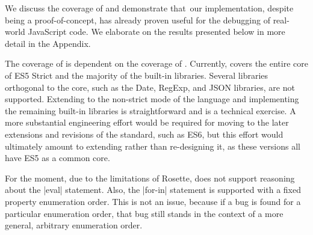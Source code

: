 
We discuss the coverage of \cosette and demonstrate that~our implementation, despite being  a proof-of-concept, has already proven useful for the debugging of real-world JavaScript code.
We elaborate on the results presented below in more detail in the Appendix. 





The coverage of \cosette is dependent on the coverage of \JSComp.
Currently, \JSComp covers the entire core of ES5 Strict and the majority of the built-in libraries.
Several libraries orthogonal to the core, such as the Date, RegExp, and JSON libraries, are not supported.
Extending \JSComp to the non-strict mode of the language and implementing the remaining built-in libraries is straightforward and is a technical exercise.
A more substantial engineering effort would be required for moving to the later extensions and revisions of the standard, such as ES6, but this effort would ultimately amount to extending \JSComp rather than re-designing it, as these versions all have ES5 as a common core.
    
 For the moment, due to the limitations of Rosette, \cosette does not support reasoning about the \jsinline|eval| statement. Also, the \jsinline|for-in| statement is supported with a fixed property enumeration order. This is not an issue, because if a bug is found for a particular enumeration order, that bug still stands in the context of a more general, arbitrary enumeration order.

